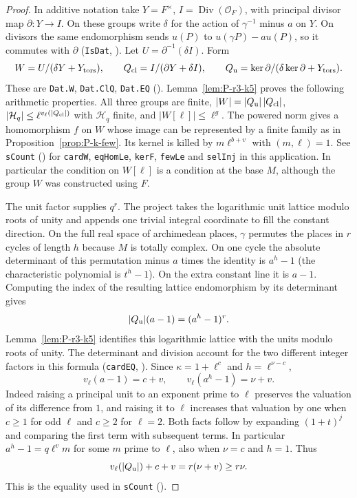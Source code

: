 \begin{proof}
In additive notation take $Y=F^\times$, $I=\operatorname{Div}(\mathcal O_F)$,
with principal divisor map $\partial:Y\to I$. On these groups write
$\delta$ for the action of $\gamma^{-1}$ minus $a$ on $Y$.
On divisors the same endomorphism sends $u(P)$ to $u(\gamma P)-a u(P)$,
so it commutes with $\partial$ (\nolinkurl{IsDat}, ).
Let $U=\partial^{-1}(\delta I)$. Form
\[
 W=U/(\delta Y+Y_{\rm tors}),\qquad
 Q_{\rm cl}=I/(\partial Y+\delta I),\qquad
 Q_{\rm u}=\ker\partial/(\delta\ker\partial+Y_{\rm tors}).
\]
These are \nolinkurl{Dat.W}, \nolinkurl{Dat.ClQ}, \nolinkurl{Dat.EQ}
().
Lemma~\ref{lem:P-r3-k5} proves the following arithmetic properties.
All three groups are finite,
$|W|=|Q_{\rm u}|\,|Q_{\rm cl}|$,
$|\mathcal H_q|\le\ell^{v_\ell(|Q_{\rm cl}|)}$ with $\mathcal H_q$ finite,
and $|W[\ell]|\le\ell^g$. The powered norm gives a homomorphism $f$ on
$W$ whose image can be represented by a finite family as in
Proposition~\ref{prop:P-k-few}. Its kernel is killed by
$m\ell^{b+v}$ with $(m,\ell)=1$. See \nolinkurl{sCount}
() for \nolinkurl{cardW},
\nolinkurl{eqHomLe}, \nolinkurl{kerF}, \nolinkurl{fewLe} and
\nolinkurl{selInj} in this application. In particular the condition
on $W[\ell]$ is a condition at the base $M$, although the group $W$ was
constructed using $F$.

The unit factor supplies $q^r$. The project takes the logarithmic
unit lattice modulo roots of unity and appends one trivial integral
coordinate to fill the constant direction. On the full real space of
archimedean places, $\gamma$ permutes the places in $r$ cycles of
length $h$ because $M$ is totally complex. On one cycle the absolute determinant
of this permutation minus $a$ times the identity is $a^h-1$
(the characteristic polynomial is $t^h-1$). On the extra constant line
it is $a-1$. Computing the index of the resulting lattice endomorphism
by its determinant gives
\[
 |Q_{\rm u}|(a-1)=(a^h-1)^r .
\]
Lemma~\ref{lem:P-r3-k5} identifies this logarithmic lattice with the
units modulo roots of unity. The determinant and division account for the two different
integer factors in this formula (\nolinkurl{cardEQ},
). Since $\kappa=1+\ell^c$
and $h=\ell^{\nu-c}$,
\[
 v_\ell(a-1)=c+v,\qquad v_\ell(a^h-1)=\nu+v.
\]
Indeed raising a principal unit to an exponent prime to $\ell$ preserves
the valuation of its difference from $1$, and raising it to $\ell$
increases that valuation by one when $c\ge1$ for odd $\ell$ and $c\ge2$
for $\ell=2$. Both facts follow by expanding $(1+t)^j$ and comparing
the first term with subsequent terms. In particular $a^h-1=q\ell^v m$
for some $m$ prime to $\ell$, also when $\nu=c$ and $h=1$. Thus
\[
 v_\ell(|Q_{\rm u}|)+c+v=r(\nu+v)\ge r\nu .
\]
This is the equality used in \nolinkurl{sCount}
().


\end{proof}
